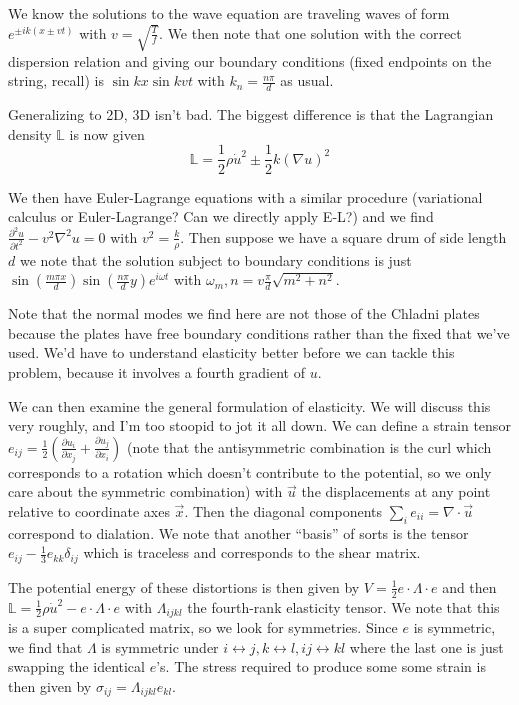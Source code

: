 \documentclass[10pt]{report}
\newcommand{\pd}[2]{\frac{\partial #1}{\partial#2}}
\newcommand{\ptd}[2]{\frac{\partial^2 #1}{\partial#2^2}}
\begin{document}
We know the solutions to the wave equation are traveling waves of form $e^{\pm ik(x \pm vt)}$ with $v = \sqrt{\frac{T}{f}}$. We then note that one solution with the correct dispersion relation and giving our boundary conditions (fixed endpoints on the string, recall) is $\sin kx \sin kvt$ with $k_n = \frac{n\pi}{d}$ as usual. 

Generalizing to 2D, 3D isn't bad. The biggest difference is that the Lagrangian density $\mathbb{L}$ is now given
$$\mathbb{L} = \frac{1}{2}\rho \dot{u}^2 \pm \frac{1}{2}k\left( \nabla u \right)^2$$

We then have Euler-Lagrange equations with a similar procedure (variational calculus or Euler-Lagrange? Can we directly apply E-L?) and we find $\ptd{u}{t} - v^2 \nabla^2 u = 0$ with $v^2 = \frac{k}{\rho}$. Then suppose we have a square drum of side length $d$ we note that the solution subject to boundary conditions is just $\sin\left( \frac{m\pi x}{d} \right) \sin \left( \frac{n\pi}{d}y \right)e^{i\omega t}$ with $\omega_m,n = v\frac{\pi}{d}\sqrt{m^2+n^2}$.

Note that the normal modes we find here are not those of the Chladni plates because the plates have free boundary conditions rather than the fixed that we've used. We'd have to understand elasticity better before we can tackle this problem, because it involves a fourth gradient of $u$. 

We can then examine the general formulation of elasticity. We will discuss this very roughly, and I'm too stoopid to jot it all down. We can define a strain tensor $e_{ij} = \frac{1}{2}\left( \pd{u_i}{x_j} + \pd{u_j}{x_i} \right)$ (note that the antisymmetric combination is the curl which corresponds to a rotation which doesn't contribute to the potential, so we only care about the symmetric combination) with $\vec{u}$ the displacements at any point relative to coordinate axes $\vec{x}$. Then the diagonal components $\sum_i e_{ii} = \nabla \cdot \vec{u}$ correspond to dialation. We note that another ``basis'' of sorts is the tensor $e_{ij} - \frac{1}{3}e_{kk}\delta_{ij}$ which is traceless and corresponds to the shear matrix.

The potential energy of these distortions is then given by $V = \frac{1}{2}e\cdot \Lambda \cdot e$ and then $\mathbb{L} = \frac{1}{2}\rho \dot{u}^2 - e\cdot \Lambda \cdot e$ with $\Lambda_{ijkl}$ the fourth-rank elasticity tensor. We note that this is a super complicated matrix, so we look for symmetries. Since $e$ is symmetric, we find that $\Lambda$ is symmetric under $i \leftrightarrow j, k \leftrightarrow l, ij \leftrightarrow kl$ where the last one is just swapping the identical $e$'s. The stress required to produce some some strain is then given by $\sigma_{ij} = \Lambda_{ijkl}e_{kl}$.
\end{document}
